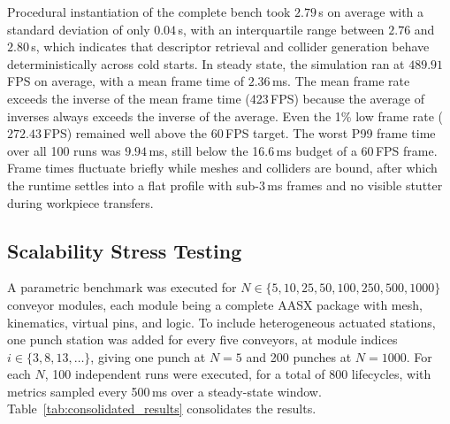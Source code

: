 \documentclass{ieeeojies}
\begin{document}
Procedural instantiation of the complete bench took $2.79$\,s on average with a standard deviation of only $0.04$\,s, with an interquartile range between $2.76$ and $2.80$\,s, which indicates that descriptor retrieval and collider generation behave deterministically across cold starts. In steady state, the simulation ran at $489.91$\,FPS on average, with a mean frame time of $2.36$\,ms. The mean frame rate exceeds the inverse of the mean frame time (423\,FPS) because the average of inverses always exceeds the inverse of the average. Even the 1\% low frame rate ($272.43$\,FPS) remained well above the 60\,FPS target. The worst P99 frame time over all 100 runs was $9.94$\,ms, still below the 16.6\,ms budget of a 60\,FPS frame. Frame times fluctuate briefly while meshes and colliders are bound, after which the runtime settles into a flat profile with sub-3\,ms frames and no visible stutter during workpiece transfers.

\subsection{Scalability Stress Testing}
\label{sec:res_stress_testing}

A parametric benchmark was executed for $N \in \{5, 10, 25, 50, 100, 250, 500, 1000\}$ conveyor modules, each module being a complete AASX package with mesh, kinematics, virtual pins, and logic. To include heterogeneous actuated stations, one punch station was added for every five conveyors, at module indices $i \in \{3, 8, 13, \dots\}$, giving one punch at $N=5$ and 200 punches at $N=1000$. For each $N$, 100 independent runs were executed, for a total of 800 lifecycles, with metrics sampled every 500\,ms over a steady-state window. Table~\ref{tab:consolidated_results} consolidates the results.
\end{document}
